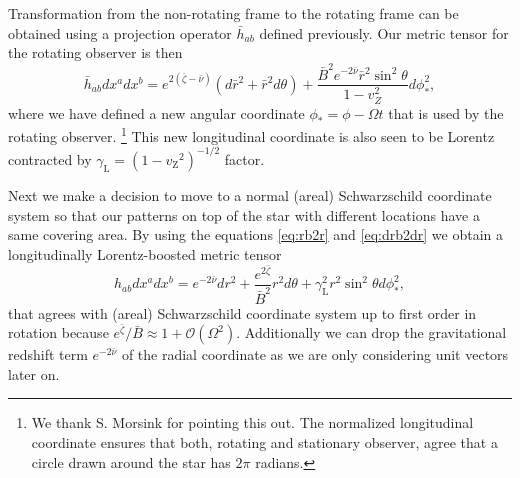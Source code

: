 \documentclass[iop, usenatbib]{emulateapj}
\newcommand{\be}{\begin{equation}}
\newcommand{\ee}{\end{equation}}
\newcommand{\sch}{Schwarzschild }
\newcommand{\rb}{\ensuremath{\bar{r}}}
\newcommand{\nub}{\ensuremath{\bar{\nu}}}
\newcommand{\zetab}{\ensuremath{\bar{\zeta}}}
\newcommand{\Bb}{\ensuremath{\bar{B}}}
\newcommand{\vz}{\ensuremath{v_{\mathrm{Z}}}}
\begin{document}
Transformation from the non-rotating frame to the rotating frame can be obtained using a projection operator $\bar{h}_{ab}$ defined previously.
Our metric tensor for the rotating observer is then
\be
\bar{h}_{ab} dx^a dx^b = e^{2(\zetab - \nub)} (d\rb^2 + \rb^2 d\theta) + \frac{\Bb^2 e^{-2\nub} \rb^2 \sin^2\theta}{1-v_Z^2} d\phi_*^2,
\ee
where we have defined a new angular coordinate $\phi_* = \phi - \Omega t$ that is used by the rotating observer.%
\footnote{We thank S. Morsink for pointing this out. 
The normalized longitudinal coordinate ensures that both, rotating and stationary observer, agree that a circle drawn around the star has $2\pi$ radians.}
This new longitudinal coordinate is also seen to be Lorentz contracted by $\gamma_\mathrm{L} = (1-\vz^2)^{-1/2}$ factor.

Next we make a decision to move to a normal (areal) \sch coordinate system so that our patterns on top of the star with different locations have a same covering area.
By using the equations \eqref{eq:rb2r} and \eqref{eq:drb2dr} we obtain a longitudinally Lorentz-boosted metric tensor
\be\label{eq:gammaSch}
h_{ab} dx^a dx^b = e^{-2\nub}dr^2 + \frac{e^{2\zetab}}{\Bb^2} r^2 d\theta + \gamma_{\mathrm{L}}^2 r^2 \sin^2\theta d\phi_*^2,
\ee
that agrees with (areal) \sch coordinate system up to first order in rotation because $e^{\zetab}/\Bb \approx 1 + \mathcal{O}(\Omega^2)$.
Additionally we can drop the gravitational redshift term $e^{-2\nub}$ of the radial coordinate as we are only considering unit vectors later on.
\end{document}
